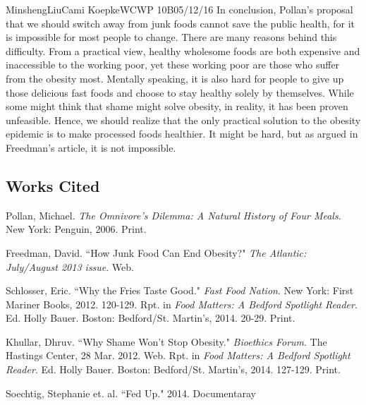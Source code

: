 \documentclass[12pt,letterpaper]{article}
\begin{document}
\begin{mla}{Minsheng}{Liu}{Cami Koepke}{WCWP 10B}{05/12/16}
In conclusion, Pollan's proposal that we should switch away from junk
foods cannot save the public health, for it is impossible for most
people to change. There are many reasons behind this difficulty. From a
practical view, healthy wholesome foods are both expensive and
inaccessible to the working poor, yet these working poor are those who
suffer from the obesity most. Mentally speaking, it is also hard for
people to give up those delicious fast foods and choose to stay healthy
solely by themselves. While some might think that shame might solve
obesity, in reality, it has been proven unfeasible. Hence, we should
realize that the only practical solution to the obesity epidemic is to
make processed foods healthier. It might be hard, but as argued in
Freedman's article, it is not impossible.


\newpage

\subsection*{Works Cited}
\bibent Pollan, Michael. \textit{The Omnivore's Dilemma: A Natural History of
Four Meals}. New York: Penguin, 2006. Print.

\bibent Freedman, David. ``How Junk Food Can End Obesity?" \textit{The Atlantic:
July/August 2013 issue}.  Web.

\bibent Schlosser, Eric. ``Why the Fries Taste Good."
\textit{Fast Food Nation}. New York: First Mariner Books, 2012. 120-129. Rpt.
in \textit{Food Matters: A Bedford Spotlight Reader}. Ed. Holly Bauer. Boston:
Bedford/St. Martin's, 2014. 20-29. Print.

\bibent Khullar, Dhruv. ``Why Shame Won’t Stop Obesity." \textit{Bioethics
Forum}. The Hastings Center, 28 Mar. 2012. Web. Rpt. in
\textit{Food Matters: A Bedford Spotlight Reader}.
Ed. Holly Bauer. Boston: Bedford/St. Martin’s, 2014. 127-129. Print.

\bibent Soechtig, Stephanie et. al. ``Fed Up." 2014. Documentaray

\end{mla}
\end{document}
